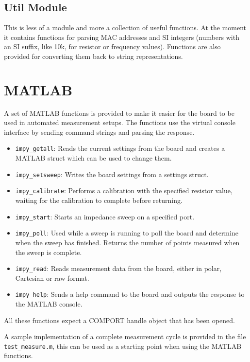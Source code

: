 

\subsection{Util Module}

This is less of a module and more a collection of useful functions. At the moment it contains functions for parsing
MAC addresses and SI integers (numbers with an SI suffix, like 10k, for resistor or frequency values). Functions
are also provided for converting them back to string representations.


\clearpage
\section{MATLAB}

A set of MATLAB functions is provided to make it easier for the board to be used in automated measurement setups.
The functions use the virtual console interface by sending command strings and parsing the response.
%
\begin{itemize}
	\item \verb!impy_getall!: Reads the current settings from the board and creates a MATLAB struct which can be used to
    change them.
  \item \verb!impy_setsweep!: Writes the board settings from a settings struct.
  \item \verb!impy_calibrate!: Performs a calibration with the specified resistor value, waiting for the calibration to
    complete before returning.
  \item \verb!impy_start!: Starts an impedance sweep on a specified port.
  \item \verb!impy_poll!: Used while a sweep is running to poll the board and determine when the sweep has finished.
    Returns the number of points measured when the sweep is complete.
  \item \verb!impy_read!: Reads measurement data from the board, either in polar, Cartesian or raw format.
  \item \verb!impy_help!: Sends a help command to the board and outputs the response to the MATLAB console.
\end{itemize}

All these functions expect a COMPORT handle object that has been opened.

A sample implementation of a complete measurement cycle is provided in the file \verb!test_measure.m!, this can be used
as a starting point when using the MATLAB functions.

